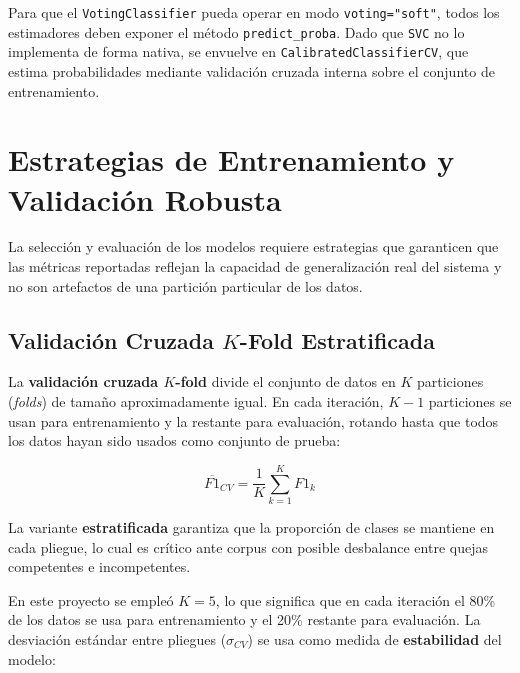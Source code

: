 Para que el \texttt{VotingClassifier} pueda operar en modo
\texttt{voting="soft"}, todos los estimadores deben exponer el método
\texttt{predict\_proba}. Dado que \texttt{SVC} no lo implementa de forma
nativa, se envuelve en \texttt{CalibratedClassifierCV}, que estima
probabilidades mediante validación cruzada interna sobre el conjunto de
entrenamiento.

\section{Estrategias de Entrenamiento y Validación Robusta}

La selección y evaluación de los modelos requiere estrategias que garanticen que
las métricas reportadas reflejan la capacidad de generalización real del sistema
y no son artefactos de una partición particular de los datos.

\subsection{Validación Cruzada $K$-Fold Estratificada}

La \textbf{validación cruzada $K$-fold} divide el conjunto de datos en $K$
particiones (\textit{folds}) de tamaño aproximadamente igual. En cada iteración,
$K-1$ particiones se usan para entrenamiento y la restante para evaluación,
rotando hasta que todos los datos hayan sido usados como conjunto de prueba:

\begin{equation}
  \overline{F1}_{CV}
  = \frac{1}{K} \sum_{k=1}^{K} F1_k
  \label{eq:cv}
\end{equation}

La variante \textbf{estratificada} garantiza que la proporción de clases se
mantiene en cada pliegue, lo cual es crítico ante corpus con posible desbalance
entre quejas competentes e incompetentes.

En este proyecto se empleó $K = 5$, lo que significa que en cada iteración
el 80\% de los datos se usa para entrenamiento y el 20\% restante para
evaluación. La desviación estándar entre pliegues ($\sigma_{CV}$) se usa como
medida de \textbf{estabilidad} del modelo:

